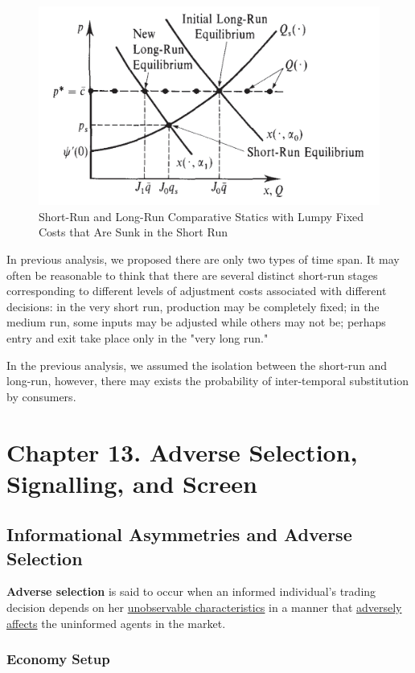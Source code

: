 \documentclass{report}
\begin{document}
		\begin{figure}[h]
			\centering
			\includegraphics[width=0.5\linewidth]{figures/SRLR_CS}
			\caption{Short-Run and Long-Run Comparative Statics with Lumpy Fixed Costs that Are Sunk in the Short Run}
		\end{figure}
		
		\begin{remark}
			In previous analysis, we proposed there are only two types of time span. It may often be reasonable to think that there are several distinct short-run stages corresponding to different levels of adjustment costs associated with different decisions: in the very short run, production may be completely fixed; in the medium run, some inputs may be adjusted while others may not be; perhaps entry and exit take place only in the "very long run."
		\end{remark}
		
		\begin{remark}
			In the previous analysis, we assumed the isolation between the short-run and long-run, however, there may exists the probability of inter-temporal substitution by consumers.
		\end{remark}
	
	\section{Chapter 13. Adverse Selection, Signalling, and Screen}
		\subsection{Informational Asymmetries and Adverse Selection}
		\begin{definition}
			\textbf{Adverse selection} is said to occur when an informed individual's trading decision depends on her \ul{unobservable characteristics} in a manner that \ul{adversely affects} the uninformed agents in the market.
		\end{definition}
		
		\subsubsection{Economy Setup}
		
\end{document}

